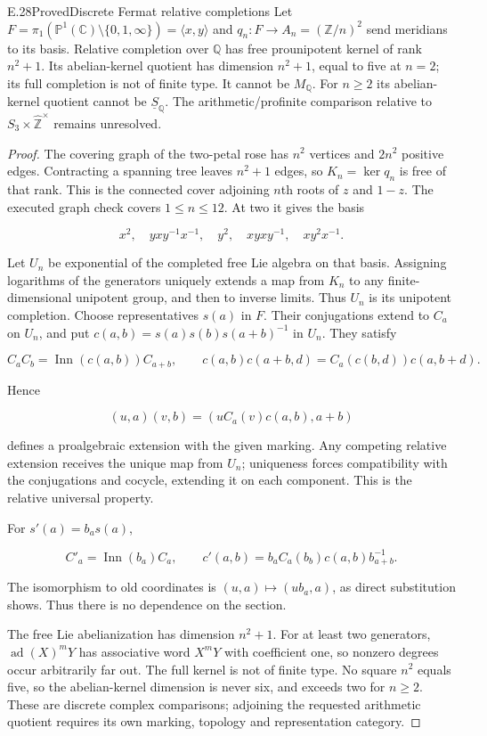 \begin{statement}{E.28}{Proved}{Discrete Fermat relative completions}
Let $F=\pi_1(\mathbb P^1(\mathbb C)\setminus\{0,1,\infty\})
=\langle x,y\rangle$ and
$q_n:F\to A_n=(\mathbb Z/n)^2$ send meridians to its basis.
Relative completion over $\mathbb Q$ has free prounipotent
kernel of rank $n^2+1$.
Its abelian-kernel quotient has dimension $n^2+1$,
equal to five at $n=2$; its full completion is not
of finite type. It cannot be $M_{\mathbb Q}$.
For $n\ge2$ its abelian-kernel quotient cannot be
$\underline S_{\mathbb Q}$.
The arithmetic/profinite comparison relative to
$S_3\times\widehat{\mathbb Z}^{\times}$ remains unresolved.
\end{statement}
\begin{proof}
The covering graph of the two-petal rose has $n^2$
vertices and $2n^2$ positive edges.
Contracting a spanning tree leaves $n^2+1$ edges,
so $K_n=\ker q_n$ is free of that rank.
This is the connected cover adjoining $n$th roots
of $z$ and $1-z$.
The executed graph check covers $1\le n\le12$.
At two it gives the basis

$$
x^2,\quad yxy^{-1}x^{-1},\quad y^2,\quad
 xyxy^{-1},\quad xy^2x^{-1}.
$$


Let $U_n$ be exponential of the completed free Lie
algebra on that basis.
Assigning logarithms of the generators uniquely
extends a map from $K_n$ to any finite-dimensional
unipotent group, and then to inverse limits.
Thus $U_n$ is its unipotent completion.
Choose representatives $s(a)$ in $F$.
Their conjugations extend to $C_a$ on $U_n$, and put
$c(a,b)=s(a)s(b)s(a+b)^{-1}$ in $U_n$.
They satisfy

$$
C_aC_b=\operatorname{Inn}(c(a,b))C_{a+b},\qquad
 c(a,b)c(a+b,d)=C_a(c(b,d))c(a,b+d).
$$

Hence

$$
(u,a)(v,b)=(uC_a(v)c(a,b),a+b)
$$

defines a proalgebraic extension with the given marking.
Any competing relative extension receives the unique
map from $U_n$; uniqueness forces compatibility with
the conjugations and cocycle, extending it on each
component. This is the relative universal property.

For $s'(a)=b_as(a)$,

$$
C'_a=\operatorname{Inn}(b_a)C_a,\qquad
 c'(a,b)=b_aC_a(b_b)c(a,b)b_{a+b}^{-1}.
$$

The isomorphism to old coordinates is $(u,a)\mapsto(ub_a,a)$,
as direct substitution shows.
Thus there is no dependence on the section.

The free Lie abelianization has dimension $n^2+1$.
For at least two generators, $\operatorname{ad}(X)^mY$
has associative word $X^mY$ with coefficient one,
so nonzero degrees occur arbitrarily far out.
The full kernel is not of finite type.
No square $n^2$ equals five, so the abelian-kernel
dimension is never six, and exceeds two for $n\ge2$.
These are discrete complex comparisons; adjoining
the requested arithmetic quotient requires its own
marking, topology and representation category.
\end{proof}
